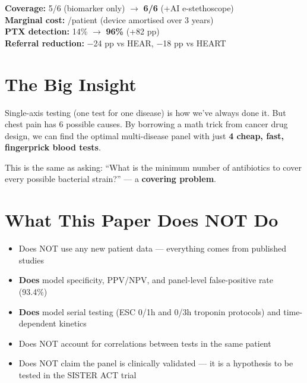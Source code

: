 \documentclass[11pt,a4paper]{article}
\begin{document}
\begin{tcolorbox}[resultbox, title={Key Numbers}]
\textbf{Coverage:} 5/6 (biomarker only) $\to$ \textbf{6/6} (+AI e-stethoscope) \\
\textbf{Marginal cost:} /patient (device amortised over 3 years) \\
\textbf{PTX detection:} 14\% $\to$ \textbf{96\%} (+82 pp) \\
\textbf{Referral reduction:} $-$24 pp vs HEAR, $-$18 pp vs HEART
\end{tcolorbox}


\section{The Big Insight}

\begin{tcolorbox}[insightbox, title={Take-home message}]
Single-axis testing (one test for one disease) is how we've always done it.
But chest pain has 6 possible causes. By borrowing a math trick from cancer
drug design, we can find the optimal multi-disease panel with just
\textbf{4 cheap, fast, fingerprick blood tests}.

This is the same as asking: ``What is the minimum number of antibiotics to
cover every possible bacterial strain?'' --- a \textbf{covering problem}.
\end{tcolorbox}


\section{What This Paper Does NOT Do}

\begin{itemize}[nosep]
  \item[\textcolor{alert}{\texttimes}] Does NOT use any new patient data ---
    everything comes from published studies
  \item[\textcolor{success}{\checkmark}] \textbf{Does} model specificity, PPV/NPV, and panel-level false-positive rate (93.4\%)
  \item[\textcolor{success}{\checkmark}] \textbf{Does} model serial testing (ESC 0/1h and 0/3h troponin protocols) and time-dependent kinetics
  \item[\textcolor{alert}{\texttimes}] Does NOT account for correlations
    between tests in the same patient
  \item[\textcolor{alert}{\texttimes}] Does NOT claim the panel is clinically
    validated --- it is a hypothesis to be tested in the SISTER ACT trial
\end{itemize}
\end{document}
